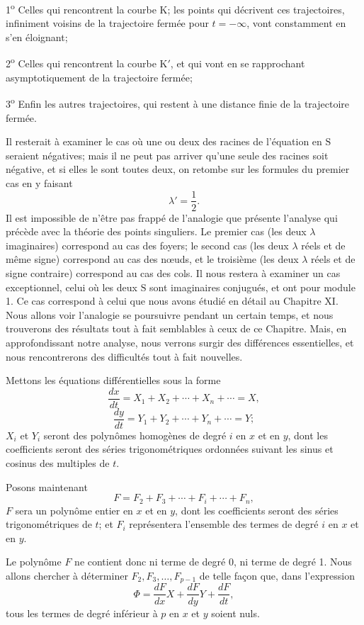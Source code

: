 \documentclass[11pt]{article}
\begin{document}
1\textsuperscript{o} Celles qui rencontrent la courbe K; les points qui décrivent ces trajectoires, infiniment voisins de la trajectoire fermée pour $t=-\infty$, vont constamment en s’en éloignant;

2\textsuperscript{o} Celles qui rencontrent la courbe K$'$, et qui vont en se rapprochant asymptotiquement de la trajectoire fermée;

3\textsuperscript{o} Enfin les autres trajectoires, qui restent à une distance finie de la trajectoire fermée.

Il resterait à examiner le cas où une ou deux des racines de l’équation en $\mathrm{S}$ seraient négatives; mais il ne peut pas arriver qu’une seule des racines soit négative, et si elles le sont toutes deux, on retombe sur les formules du premier cas en y faisant
\[
\lambda'=\frac12.
\]
Il est impossible de n’être pas frappé de l’analogie que présente l’analyse qui précède avec la théorie des points singuliers. Le premier cas (les deux $\lambda$ imaginaires) correspond au cas des foyers; le second cas (les deux $\lambda$ réels et de même signe) correspond au cas des nœuds, et le troisième (les deux $\lambda$ réels et de signe contraire) correspond au cas des cols. Il nous restera à examiner un cas exceptionnel, celui où les deux $\mathrm{S}$ sont imaginaires conjugués, et ont pour module 1. Ce cas correspond à celui que nous avons étudié en détail au Chapitre XI. Nous allons voir l’analogie se poursuivre pendant un certain temps, et nous trouverons des résultats tout à fait semblables à ceux de ce Chapitre. Mais, en approfondissant notre analyse, nous verrons surgir des différences essentielles, et nous rencontrerons des difficultés tout à fait nouvelles.

Mettons les équations différentielles sous la forme
\[
\frac{dx}{dt}=X_1+X_2+\cdots+X_n+\cdots=X,
\]
\[
\frac{dy}{dt}=Y_1+Y_2+\cdots+Y_n+\cdots=Y;
\]
$X_i$ et $Y_i$ seront des polynômes homogènes de degré $i$ en $x$ et en $y$, dont les coefficients seront des séries trigonométriques ordonnées suivant les sinus et cosinus des multiples de $t$.

Posons maintenant
\[
F=F_2+F_3+\cdots+F_i+\cdots+F_n,
\]
$F$ sera un polynôme entier en $x$ et en $y$, dont les coefficients seront des séries trigonométriques de $t$; et $F_i$ représentera l’ensemble des termes de degré $i$ en $x$ et en $y$.

Le polynôme $F$ ne contient donc ni terme de degré 0, ni terme de degré 1. Nous allons chercher à déterminer $F_2,F_3,\ldots,F_{p-1}$ de telle façon que, dans l’expression
\[
\Phi=\frac{dF}{dx}X+\frac{dF}{dy}Y+\frac{dF}{dt},
\]
tous les termes de degré inférieur à $p$ en $x$ et $y$ soient nuls.
\end{document}
